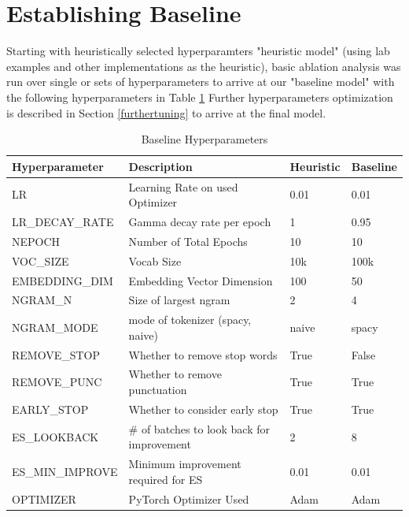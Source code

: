 \documentclass[a4paper,10pt]{article}
\begin{document}
\section{Establishing Baseline}
Starting with heuristically selected hyperparamters "heuristic model" (using lab examples and other implementations as the heuristic), basic ablation analysis was run over single or sets of hyperparameters to arrive at our "baseline model" with the following hyperparameters in Table \ref{tbl:hyperparams}  Further hyperparameters optimization is described in Section \ref{furthertuning} to arrive at the final model.

\begin{table}[!htbp]
\begin{tabular}{| l | l | l | l |}
\hline
Hyperparameter   & Description                                &  Heuristic & Baseline  \\
\hline
LR               & Learning Rate on used Optimizer            & 0.01             & 0.01           \\
LR\_DECAY\_RATE  & Gamma decay rate per epoch                 & 1                & 0.95           \\
NEPOCH           & Number of Total Epochs                     & 10               & 10             \\
VOC\_SIZE        & Vocab Size                                 & 10k              & 100k           \\
EMBEDDING\_DIM   & Embedding Vector Dimension                 & 100              & 50             \\
NGRAM\_N         & Size of largest ngram                      & 2                & 4              \\
NGRAM\_MODE      & mode of tokenizer (spacy, naive)           & naive            & spacy          \\
REMOVE\_STOP     & Whether to remove stop words               & True             & False          \\
REMOVE\_PUNC     & Whether to remove punctuation              & True             & True           \\
EARLY\_STOP      & Whether to consider early stop             & True             & True           \\
ES\_LOOKBACK     & \# of batches to look back for improvement & 2                & 8              \\
ES\_MIN\_IMPROVE & Minimum improvement required for ES        & 0.01             & 0.01           \\
OPTIMIZER        & PyTorch Optimizer Used                     & Adam             & Adam           \\
\hline
\end{tabular}
\caption{Baseline Hyperparameters}\label{tbl:hyperparams}
\end{table}
\end{document}
